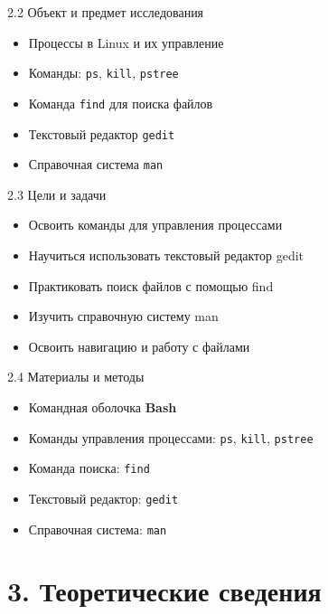 \documentclass[
  ignorenonframetext,
  aspectratio=169,
  russian,
]{beamer}
\providecommand{\tightlist}{%
  \setlength{\itemsep}{0pt}\setlength{\parskip}{0pt}}
\begin{document}
\begin{frame}[fragile]{2.2 Объект и предмет исследования}
\label{ux43eux431ux44aux435ux43aux442-ux438-ux43fux440ux435ux434ux43cux435ux442-ux438ux441ux441ux43bux435ux434ux43eux432ux430ux43dux438ux44f}
\begin{itemize}[<+->]
\tightlist
\item
  Процессы в Linux и их управление
\item
  Команды: \texttt{ps}, \texttt{kill}, \texttt{pstree}
\item
  Команда \texttt{find} для поиска файлов
\item
  Текстовый редактор \texttt{gedit}
\item
  Справочная система \texttt{man}
\end{itemize}
\end{frame}

\begin{frame}{2.3 Цели и задачи}
\label{ux446ux435ux43bux438-ux438-ux437ux430ux434ux430ux447ux438}
\begin{itemize}[<+->]
\tightlist
\item
  Освоить команды для управления процессами
\item
  Научиться использовать текстовый редактор gedit
\item
  Практиковать поиск файлов с помощью find
\item
  Изучить справочную систему man
\item
  Освоить навигацию и работу с файлами
\end{itemize}
\end{frame}

\begin{frame}[fragile]{2.4 Материалы и методы}
\label{ux43cux430ux442ux435ux440ux438ux430ux43bux44b-ux438-ux43cux435ux442ux43eux434ux44b}
\begin{itemize}[<+->]
\tightlist
\item
  Командная оболочка \textbf{Bash}
\item
  Команды управления процессами: \texttt{ps}, \texttt{kill},
  \texttt{pstree}
\item
  Команда поиска: \texttt{find}
\item
  Текстовый редактор: \texttt{gedit}
\item
  Справочная система: \texttt{man}
\end{itemize}
\end{frame}

\section{3. Теоретические
сведения}\label{ux442ux435ux43eux440ux435ux442ux438ux447ux435ux441ux43aux438ux435-ux441ux432ux435ux434ux435ux43dux438ux44f}
\end{document}
